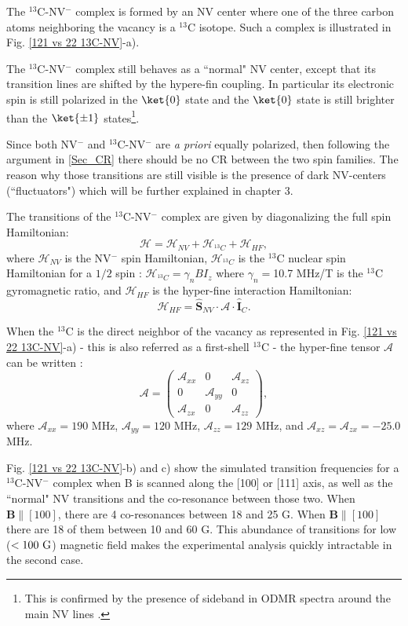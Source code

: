 \documentclass[a4paper, 11pt]{report}
\begin{document}
The $^{13}$C-NV$^-$ complex is formed by an NV center where one of the three carbon atoms neighboring the vacancy is a $^{13}$C isotope. Such a complex is illustrated in Fig. \ref{121 vs 22 13C-NV}-a).

The $^{13}$C-NV$^-$ complex still behaves as a ``normal" NV center, except that its transition lines are shifted by the hypere-fin coupling. In particular its electronic spin is still polarized in the $\ket{0}$ state and the $\ket{0}$ state is still brighter than the $\ket{\pm 1}$ states\footnote{This is confirmed by the presence of sideband in ODMR spectra around the main NV lines \citep{simanovskaia2013sidebands}.}. 

Since both NV$^-$ and $^{13}$C-NV$^-$ are \textit{a priori} equally polarized, then following the argument in \ref{Sec_CR} there should be no CR between the two spin families. The reason why those transitions are still visible is the presence of dark NV-centers (``fluctuators") which will be further explained in chapter 3.

The transitions of the $^{13}$C-NV$^-$ complex are given by diagonalizing the full spin Hamiltonian:
\begin{equation*}
\mathcal{H}=\mathcal{H}_{NV}+\mathcal{H}_{^{13}C}+\mathcal{H}_{HF},
\end{equation*}
where $\mathcal{H}_{NV}$ is the NV$^-$ spin Hamiltonian,
$\mathcal{H}_{^{13}C}$ is the $^{13}$C nuclear spin Hamiltonian for a $1/2$ spin : $\mathcal{H}_{^{13}C}=\gamma_{n} B I_z$ where $\gamma_{n}=$10.7 MHz/T is the $^{13}$C gyromagnetic ratio, and $\mathcal{H}_{HF}$ is the hyper-fine interaction Hamiltonian: $$\mathcal{H}_{HF}= \hat{\mathbf{S}}_{NV} \cdot \mathcal{A} \cdot \hat{\mathbf{I}}_C.$$

When the $^{13}$C is the direct neighbor of the vacancy as represented in Fig. \ref{121 vs 22 13C-NV}-a) - this is also referred as a first-shell $^{13}$C - the hyper-fine tensor $\mathcal{A}$ can be written \citep{simanovskaia2013sidebands}:
$$ \mathcal{A} = \begin{pmatrix}
\mathcal{A}_{xx} & 0 & \mathcal{A}_{xz} \\ 0 & \mathcal{A}_{yy} & 0 \\ \mathcal{A}_{zx} & 0 & \mathcal{A}_{zz}
\end{pmatrix},$$
where $\mathcal{A}_{xx}=190$ MHz, $\mathcal{A}_{yy}=120$ MHz, $\mathcal{A}_{zz}=129$ MHz, and  $\mathcal{A}_{xz}=\mathcal{A}_{zx}=-25.0$ MHz. 

Fig. \ref{121 vs 22 13C-NV}-b) and c) show the simulated transition frequencies for a $^{13}$C-NV$^-$ complex when B is scanned along the [100] or [111] axis, as well as the ``normal" NV transitions and the co-resonance between those two. When $\mathbf{B} \parallel [100]$, there are 4 co-resonances between 18 and 25 G. When $\mathbf{B} \parallel [100]$ there are 18 of them between 10 and 60 G. This abundance of transitions for low ($<100\ \rm G$) magnetic field makes the experimental analysis quickly intractable in the second case.
\end{document}
